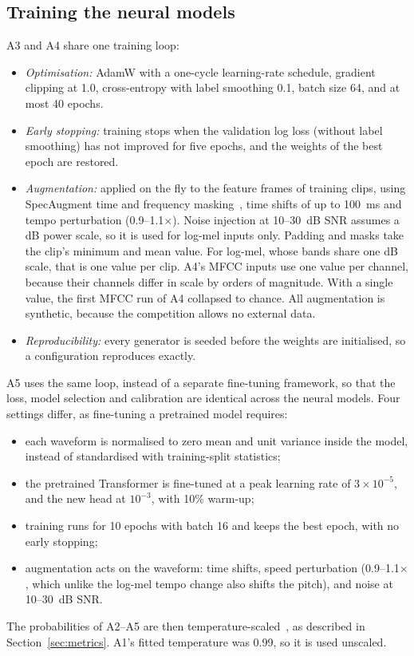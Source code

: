 \subsection{Training the neural models}
A3 and A4 share one training loop:
\begin{itemize}
  \item \emph{Optimisation:} AdamW with a one-cycle learning-rate schedule, gradient clipping at 1.0, cross-entropy
        with label smoothing 0.1, batch size 64, and at most 40 epochs.
  \item \emph{Early stopping:} training stops when the validation log loss (without label smoothing) has not
        improved for five epochs, and the weights of the best epoch are restored.
  \item \emph{Augmentation:} applied on the fly to the feature frames of training clips, using SpecAugment time and
        frequency masking~\cite{park2019specaugment}, time shifts of up to 100~ms and tempo perturbation
        (0.9--1.1$\times$). Noise injection at 10--30~dB SNR assumes a dB power scale, so it is used for log-mel
        inputs only. Padding and masks take the clip's minimum and mean value. For log-mel, whose bands share one
        dB scale, that is one value per clip. A4's MFCC inputs use one value per channel, because their channels
        differ in scale by orders of magnitude. With a single value, the first MFCC run of A4 collapsed to chance.
        All augmentation is synthetic, because the competition allows no external data.
  \item \emph{Reproducibility:} every generator is seeded before the weights are initialised, so a configuration
        reproduces exactly.
\end{itemize}
A5 uses the same loop, instead of a separate fine-tuning framework, so that the loss, model selection and
calibration are identical across the neural models. Four settings differ, as fine-tuning a pretrained model
requires:
\begin{itemize}
  \item each waveform is normalised to zero mean and unit variance inside the model, instead of standardised with
        training-split statistics;
  \item the pretrained Transformer is fine-tuned at a peak learning rate of $3\times10^{-5}$, and the new head at
        $10^{-3}$, with 10\% warm-up;
  \item training runs for 10 epochs with batch 16 and keeps the best epoch, with no early stopping;
  \item augmentation acts on the waveform: time shifts, speed perturbation (0.9--1.1$\times$, which unlike the
        log-mel tempo change also shifts the pitch), and noise at 10--30~dB SNR.
\end{itemize}
The probabilities of A2--A5 are then temperature-scaled~\cite{guo2017calibration}, as described in
Section~\ref{sec:metrics}. A1's fitted temperature was 0.99, so it is used unscaled.

